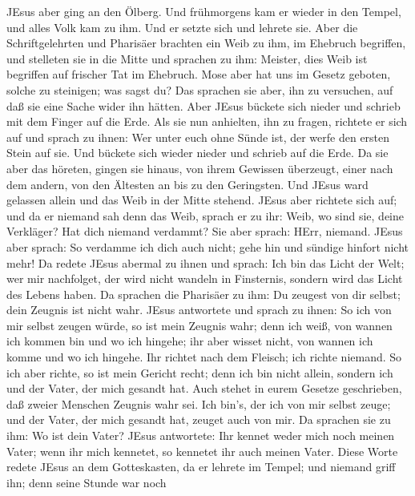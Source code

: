  JEsus aber ging an den Ölberg.  Und frühmorgens
kam er wieder in den Tempel, und alles Volk kam zu ihm. Und er setzte
sich und lehrete sie.  Aber die Schriftgelehrten und
Pharisäer brachten ein Weib zu ihm, im Ehebruch begriffen, und stelleten
sie in die Mitte  und sprachen zu ihm: Meister, dies Weib
ist begriffen auf frischer Tat im Ehebruch.  Mose aber hat
uns im Gesetz geboten, solche zu steinigen; was sagst du? 
Das sprachen sie aber, ihn zu versuchen, auf daß sie eine Sache wider
ihn hätten. Aber JEsus bückete sich nieder und schrieb mit dem Finger
auf die Erde.  Als sie nun anhielten, ihn zu fragen,
richtete er sich auf und sprach zu ihnen: Wer unter euch ohne Sünde ist,
der werfe den ersten Stein auf sie.  Und bückete sich wieder
nieder und schrieb auf die Erde.  Da sie aber das höreten,
gingen sie hinaus, von ihrem Gewissen überzeugt, einer nach dem andern,
von den Ältesten an bis zu den Geringsten. Und JEsus ward gelassen
allein und das Weib in der Mitte stehend.  JEsus aber
richtete sich auf; und da er niemand sah denn das Weib, sprach er zu
ihr: Weib, wo sind sie, deine Verkläger? Hat dich niemand verdammt?
 Sie aber sprach: HErr, niemand. JEsus aber sprach: So
verdamme ich dich auch nicht; gehe hin und sündige hinfort nicht mehr!
 Da redete JEsus abermal zu ihnen und sprach: Ich bin das
Licht der Welt; wer mir nachfolget, der wird nicht wandeln in
Finsternis, sondern wird das Licht des Lebens haben.  Da
sprachen die Pharisäer zu ihm: Du zeugest von dir selbst; dein Zeugnis
ist nicht wahr.  JEsus antwortete und sprach zu ihnen: So
ich von mir selbst zeugen würde, so ist mein Zeugnis wahr; denn ich
weiß, von wannen ich kommen bin und wo ich hingehe; ihr aber wisset
nicht, von wannen ich komme und wo ich hingehe.  Ihr
richtet nach dem Fleisch; ich richte niemand.  So ich aber
richte, so ist mein Gericht recht; denn ich bin nicht allein, sondern
ich und der Vater, der mich gesandt hat.  Auch stehet in
eurem Gesetze geschrieben, daß zweier Menschen Zeugnis wahr sei.
 Ich bin's, der ich von mir selbst zeuge; und der Vater,
der mich gesandt hat, zeuget auch von mir.  Da sprachen sie
zu ihm: Wo ist dein Vater? JEsus antwortete: Ihr kennet weder mich noch
meinen Vater; wenn ihr mich kennetet, so kennetet ihr auch meinen Vater.
 Diese Worte redete JEsus an dem Gotteskasten, da er
lehrete im Tempel; und niemand griff ihn; denn seine Stunde war noch
